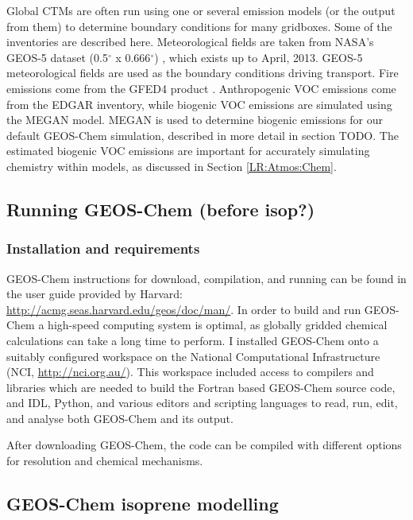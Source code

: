     Global CTMs are often run using one or several emission models (or the output from them) to determine boundary conditions for many gridboxes.
    Some of the inventories are described here.
    Meteorological fields are taken from NASA's GEOS-5 dataset (0.5$^{\circ}$ x 0.666$^{\circ}$) \parencite{Chen2009}, which exists up to April, 2013.
    GEOS-5 meteorological fields are used as the boundary conditions driving transport.
    Fire emissions come from the GFED4 product \parencite{Giglio2013}. 
    Anthropogenic VOC emissions come from the EDGAR inventory, while biogenic VOC emissions are simulated using the MEGAN model.
    MEGAN is used to determine biogenic emissions for our default GEOS-Chem simulation, described in more detail in section TODO.
    The estimated biogenic VOC emissions are important for accurately simulating chemistry within models, as discussed in Section \ref{LR:Atmos:Chem}.
    
  
  \subsection{Running GEOS-Chem (before isop?)}
    \label{Model:GC:running}
    \subsubsection{Installation and requirements}
      GEOS-Chem instructions for download, compilation, and running can be found in the user guide provided by Harvard: \url{http://acmg.seas.harvard.edu/geos/doc/man/}.
      In order to build and run GEOS-Chem a high-speed computing system is optimal, as globally gridded chemical calculations can take a long time to perform.
      I installed GEOS-Chem onto a suitably configured workspace on the National Computational Infrastructure (NCI, \url{http://nci.org.au/}). 
      This workspace included access to compilers and libraries which are needed to build the Fortran based GEOS-Chem source code, and IDL, Python, and various editors and scripting languages to read, run, edit, and analyse both GEOS-Chem and its output.
      
      After downloading GEOS-Chem, the code can be compiled with different options for resolution and chemical mechanisms.
  
  \subsection{GEOS-Chem isoprene modelling}
    \label{Model:GC:Isop}

